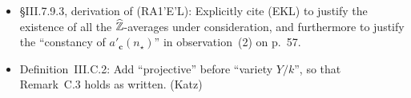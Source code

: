 \documentclass[12pt]{article}
\begin{document}
\begin{itemize}
    (These changes are important for \S10, but not for \S9.)
    
    One could also remark that \emph{morally}, when applying (RA1) here (towards (RA1')) and elsewhere (via (RA1'), (RA1'E), and (RA1'E')),
    it suffices to work with boxes $\mcal{B}(\bm{Z})$ of \emph{intermediate} ``lopsidedness'' (say $\leq Z/Z^{1-\hbar} = Z^\hbar$),
    and with moduli $n_0$ and shifts $\abs{t}$ of \emph{small} size (say $\leq Z^{\hbar^2}$).
    
    \item \S{III.7.9.3}, derivation of (RA1’E’L):
    Explicitly cite (EKL) to justify the existence of all the $\widehat{\mathbb{Z}}$-averages under consideration,
    and furthermore to justify the ``constancy of $a'_{\bm{c}}(n_\star)$'' in observation~(2) on p.~57.
    
    \item Definition~III.C.2:
    Add ``projective'' before ``variety $Y/k$'',
    so that Remark~C.3 holds as written.
    (Katz)
    
    
    
    

\end{itemize}
\end{document}
